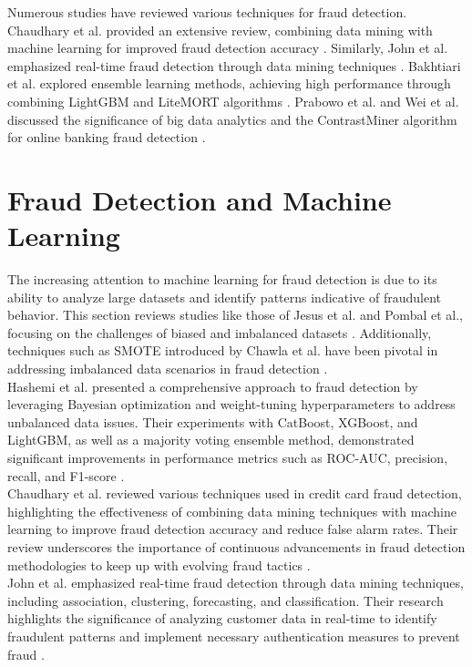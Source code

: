 \documentclass[12pt,a4paper]{report}
\begin{document}
Numerous studies have reviewed various techniques for fraud detection. Chaudhary et al. provided an extensive review, combining data mining with machine learning for improved fraud detection accuracy \citep{chaudhary2012review}. Similarly, John et al. emphasized real-time fraud detection through data mining techniques \citep{john2016realtime}. Bakhtiari et al. explored ensemble learning methods, achieving high performance through combining LightGBM and LiteMORT algorithms \citep{bakhtiari2023credit}. Prabowo et al. and Wei et al. discussed the significance of big data analytics and the ContrastMiner algorithm for online banking fraud detection \citep{prabowo2016learning, wei2013effective}.\\

\section{Fraud Detection and Machine Learning}
The increasing attention to machine learning for fraud detection is due to its ability to analyze large datasets and identify patterns indicative of fraudulent behavior. This section reviews studies like those of Jesus et al. and Pombal et al., focusing on the challenges of biased and imbalanced datasets \citep{jesus2022turning, pombal2022understanding}. Additionally, techniques such as SMOTE introduced by Chawla et al. have been pivotal in addressing imbalanced data scenarios in fraud detection \citep{chawla2002smote}.\\

Hashemi et al. presented a comprehensive approach to fraud detection by leveraging Bayesian optimization and weight-tuning hyperparameters to address unbalanced data issues. Their experiments with CatBoost, XGBoost, and LightGBM, as well as a majority voting ensemble method, demonstrated significant improvements in performance metrics such as ROC-AUC, precision, recall, and F1-score \citep[p. 3034]{hashemi2022fraud}.\\

Chaudhary et al. reviewed various techniques used in credit card fraud detection, highlighting the effectiveness of combining data mining techniques with machine learning to improve fraud detection accuracy and reduce false alarm rates. Their review underscores the importance of continuous advancements in fraud detection methodologies to keep up with evolving fraud tactics \citep[p. 39]{chaudhary2012review}.\\

John et al. emphasized real-time fraud detection through data mining techniques, including association, clustering, forecasting, and classification. Their research highlights the significance of analyzing customer data in real-time to identify fraudulent patterns and implement necessary authentication measures to prevent fraud \citep[p. 1186]{john2016realtime}.\\
\end{document}
